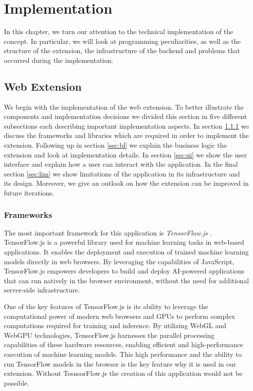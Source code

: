 \chapter{Implementation}
\label{cha:implementation}

In this chapter, we turn our attention to the technical implementation of the concept. In particular, we will look at programming
peculiarities, as well as the structure of the extension, the infrastructure of the backend and problems that occurred during the implementation.

\section{Web Extension}
We begin with the implementation of the web extension. To better illustrate the components and implementation decisions we divided this section
in five different subsections each describing important implementation aspects. In section \ref{sec:frameworks} we discuss the frameworks
and libraries which are required in order to implement the extension. Following up in section \ref{sec:bl} we explain the business logic 
the extension and look at implementation details. In section \ref{sec:ui} we show the user interface and explain how a user can interact with
the application. In the final section \ref{sec:lim} we show limitations of the application in its infrastructure and its design. Moreover, we give
an outlook on how the extension can be improved in future iterations.
\subsection{Frameworks}
\label{sec:frameworks}
The most important framework for this application is \emph{TensorFlow.js} \cite{tensorflowJs}.
TensorFlow.js is a powerful library used for machine learning tasks in web-based applications.
It enables the deployment and execution of trained machine learning models directly in web browsers.
By leveraging the capabilities of JavaScript, TensorFlow.js empowers developers to build and deploy AI-powered
applications that can run natively in the browser environment, without the need for additional server-side infrastructure.

One of the key features of TensorFlow.js is its ability to leverage the computational power of modern web browsers and GPUs
to perform complex computations required for training and inference. By utilizing WebGL and WebGPU technologies, TensorFlow.js
harnesses the parallel processing capabilities of these hardware resources, enabling efficient and high-performance execution
of machine learning models. This high performance and the ability to run TensorFlow models in the browser is the key feature why it is
used in our extension. Without TesnsorFlow.js the creation of this application would not be possible.


